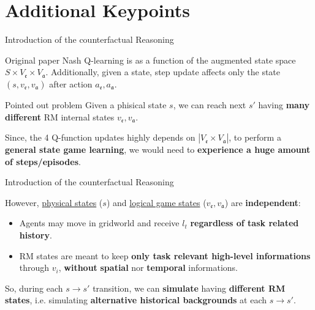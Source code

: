 \documentclass[10pt, aspectratio=169]{beamer}
\newcommand{\evidenzia}[1]{\textcolor{verdeSalvia}{\textbf{#1}}}
\begin{document}
\section{Additional Keypoints}

\begin{frame}{Introduction of the counterfactual Reasoning}

    Original paper Nash Q-learning is as a function of the augmented state space $S \times V_{\mathfrak{e}} \times V_{\mathfrak{a}}$. 
    Additionally, given a state, step update affects only the state $(s, v_{\mathfrak{e}}, v_{\mathfrak{a}})$ after action $a_\mathfrak{e}, a_\mathfrak{a}$.
    
    \vspace{0.5cm}
    \begin{block}{Pointed out problem}
    Given a phisical state $s$, we can reach next $s'$ having \evidenzia{many different} RM internal states $v_\mathfrak{e},v_\mathfrak{a}$. 
    
    Since, the 4 Q-function updates highly depends on $|V_\mathfrak{e}\times V_\mathfrak{a}|$, to perform a \evidenzia{general state game learning}, we would need to \evidenzia{experience a huge amount of steps/episodes}.
    \end{block}

\end{frame}

\begin{frame}{Introduction of the counterfactual Reasoning}

However, \underline{physical states} ($s$) and \underline{logical game states} ($v_\mathfrak{e}, v_\mathfrak{a}$) are \evidenzia{independent}: 
\begin{itemize}
    \item Agents may move in gridworld and receive $l_t$ \evidenzia{regardless of task related history}. 
    \item RM states are meant to keep \evidenzia{only task relevant high-level informations} through $v_i$, \evidenzia{without} \evidenzia{spatial} nor \evidenzia{temporal} informations. 
\end{itemize}
\vspace{0.5cm}
So, during each $s\rightarrow s'$ transition, we can \evidenzia{simulate} having \evidenzia{different RM states}, i.e. simulating \evidenzia{alternative historical backgrounds} at each $s\rightarrow s'$.
\end{frame}
\end{document}
